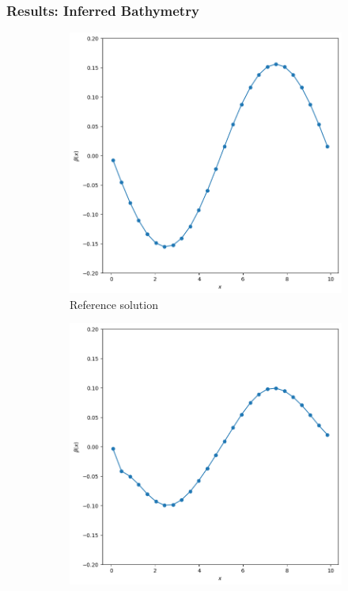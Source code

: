 \begin{frame}
    \frametitle{Results: Inferred Bathymetry}

    \begin{figure}
        \centering
        \begin{subfigure}[b]{0.45\textwidth}
            \centering
            \includegraphics[width=\textwidth]{images/inhomogeneous_swe_pseudospectral_bathymetry_angle.png}
            \caption{Reference solution}
            \label{fig:17_inhomogeneous_pseudospectral_swe_bathymetry}
        \end{subfigure}
        \hfill
        \begin{subfigure}[b]{0.45\textwidth}
            \centering
            \includegraphics[width=\textwidth]{images/inhomogeneous_swe_pinn_bathymetry_angle.png}

\end{subfigure}
\end{figure}
\end{frame}
